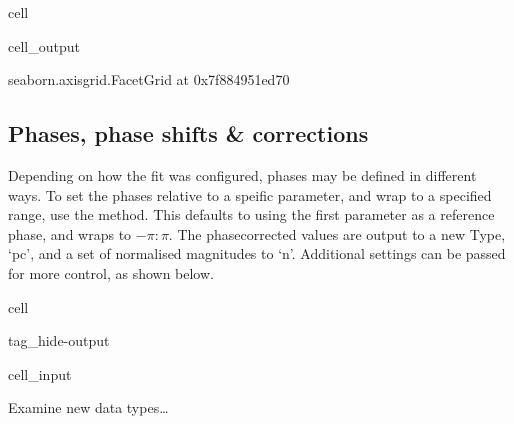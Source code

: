 \documentclass[letterpaper,table,10pt,english]{jupyterBook}
\begin{document}
\begin{sphinxuseclass}{cell}
\begin{sphinxVerbatimOutput}
\begin{sphinxuseclass}{cell_output}
\begin{sphinxVerbatim}[commandchars=\\\{\}]
\PYGZlt{}seaborn.axisgrid.FacetGrid at 0x7f884951ed70\PYGZgt{}
\end{sphinxVerbatim}

\noindent{}

\end{sphinxuseclass}\end{sphinxVerbatimOutput}

\end{sphinxuseclass}

\subsection{Phases, phase shifts \& corrections}
\label{\detokenize{part2/case-study-C2H4_290723:phases-phase-shifts-corrections}}
\sphinxAtStartPar
Depending on how the fit was configured, phases may be defined in different ways. To set the phases relative to a speific parameter, and wrap to a specified range, use the  method. This defaults to using the first parameter as a reference phase, and wraps to \(-\pi:\pi\). The phase\sphinxhyphen{}corrected values are output to a new Type, ‘pc’, and a set of normalised magnitudes to ‘n’. Additional settings can be passed for more control, as shown below.

\begin{sphinxuseclass}{cell}
\begin{sphinxuseclass}{tag_hide-output}\begin{sphinxVerbatimInput}

\begin{sphinxuseclass}{cell_input}
\begin{sphinxVerbatim}[commandchars=\\\{\}]
 
\end{sphinxVerbatim}

\end{sphinxuseclass}\end{sphinxVerbatimInput}

\end{sphinxuseclass}
\end{sphinxuseclass}
\sphinxAtStartPar
Examine new data types…
\end{document}
